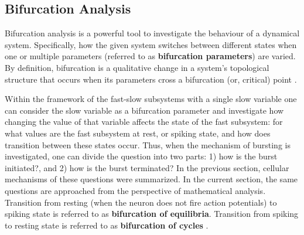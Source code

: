 \documentclass[../main.tex]{subfiles}
\begin{document}


\subsection{Bifurcation Analysis} \label{subsec:bifurcation_analysis}

Bifurcation analysis is a powerful tool to investigate the behaviour of
a dynamical system. Specifically, how the given system switches between
different states when one or multiple parameters (referred to as \textbf{bifurcation parameters})
are varied. By definition, bifurcation is a qualitative change in a system's topological structure that occurs when its parameters cross a bifurcation (or, critical) point \parencite{kuznetsovElementsAppliedBifurcation2023}.

Within the framework of the fast-slow subsystems with a single slow variable one can consider the slow variable as a bifurcation parameter and investigate how changing the value of that variable affects the state of the fast subsystem: for what values are the fast subsystem at rest, or spiking state, and how does transition between these states occur. Thus, when the mechanism of bursting is investigated,
one can divide the question into two parts: 1) how is the burst initiated?, and 2) how is the burst terminated? In the previous section, cellular mechanisms of these questions were summarized. In the current section, the same questions are approached from the perspective of mathematical analysis. Transition from resting (when the neuron does not fire action potentials) to spiking state is referred to as \textbf{bifurcation of equilibria}. Transition from spiking to resting state is referred to as \textbf{bifurcation of cycles} \parencite{izhikevichNEURALEXCITABILITYSPIKING2000,izhikevichDynamicalSystemsNeuroscience2006}.
\end{document}
